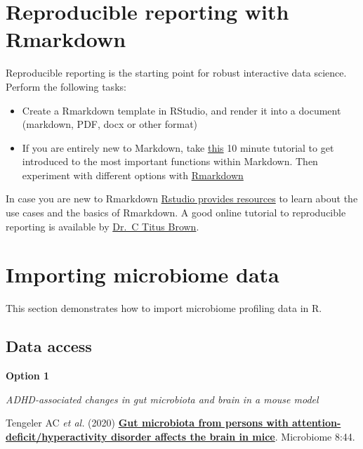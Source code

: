 \documentclass[
  oneside]{book}
\begin{document}
\hypertarget{reproducible-reporting-with-rmarkdown}{%
\chapter{Reproducible reporting with Rmarkdown}\label{reproducible-reporting-with-rmarkdown}}

Reproducible reporting is the starting point for robust interactive
data science. Perform the following tasks:

\begin{itemize}
\item
  Create a Rmarkdown template in RStudio, and render it into a
  document (markdown, PDF, docx or other format)
\item
  If you are entirely new to Markdown, take
  \href{https://www.markdowntutorial.com/}{this} 10 minute tutorial to get
  introduced to the most important functions within Markdown. Then
  experiment with different options with
  \href{https://www.rstudio.com/wp-content/uploads/2015/02/rmarkdown-cheatsheet.pdf}{Rmarkdown}
\end{itemize}

In case you are new to Rmarkdown \href{https://rmarkdown.rstudio.com/lesson-1.html}{Rstudio provides
resources} to learn
about the use cases and the basics of Rmarkdown. A good online
tutorial to reproducible reporting is available by \href{https://rpubs.com/marschmi/RMarkdown}{Dr.~C Titus
Brown}.

\hypertarget{importing-microbiome-data}{%
\chapter{Importing microbiome data}\label{importing-microbiome-data}}

This section demonstrates how to import microbiome profiling data in R.

\hypertarget{data-access}{%
\section{Data access}\label{data-access}}

\textbf{Option 1}

\emph{ADHD-associated changes in gut microbiota and brain in a mouse model}

Tengeler AC \emph{et
al.} (2020) \href{https://doi.org/10.1186/s40168-020-00816-x}{\textbf{Gut microbiota from persons with
attention-deficit/hyperactivity disorder affects the brain in
mice}}. Microbiome
8:44.
\end{document}
